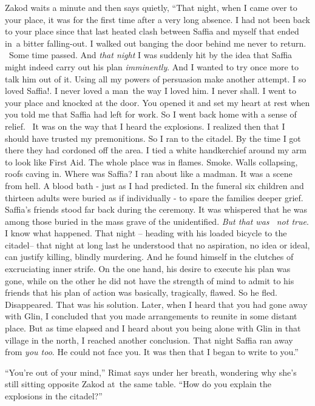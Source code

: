 \documentclass[twoside,11pt]{book}
\begin{document}
Zakod waits a minute and then says quietly, ``That night, when I came over to your place,{
}it was for the first time after a very long absence. I had not been back{ }to
your place since that last heated clash between Saffia and myself that ended in~a bitter falling-out. I walked out
banging the door behind me never to return. ~Some time passed. And \textit{that night} I was suddenly hit by the idea
that Saffia might indeed carry out his plan \textit{imminently}. And I wanted to try once more to talk him out of it.
Using all my powers of persuasion make another attempt. I so loved Saffia!. I never loved a man~the way I loved him. I
never shall. I went to your place and knocked at the door. You opened it and set my heart at rest when you told me that
Saffia had left for work. So I went back home with a sense of relief. \ It was on the way that I heard the explosions.
I realized then that I should have trusted my premonitions. So I ran to the citadel. By the time I got there they had
cordoned off the area. I tied a white handkerchief around my arm to look like First Aid. The whole place was in flames.
Smoke. Walls collapsing, roofs caving in. Where was Saffia? I ran about like a madman. It was a scene from hell. A
blood bath - just as I had predicted. In the funeral six children and thirteen adults were buried as if individually -
to spare the families deeper grief. Saffia's friends stood far back during the ceremony. It was whispered that he was
among those buried in the mass grave of the unidentified. \textit{But that was ~not true}. I know what happened. That
night -- heading with his loaded bicycle to the citadel-- that night at long last he understood that no aspiration, no
idea or ideal, can justify killing, blindly murdering. And he found himself in the clutches of excruciating inner
strife. On the one hand, his desire to execute his plan was gone, while on the other he did not have the strength of
mind to admit to his friends that his plan of action was basically, tragically, flawed. So he fled. Disappeared. That
was his solution. Later, when I heard that you had gone away with Glin, I concluded that you made arrangements to
reunite in some distant place. But as time elapsed and I heard about you being alone with Glin in that village in the
north, I reached another conclusion. That night Saffia ran away from\textit{ you too}. He could not face you. It was
then that I began to write to you.''

``You're out of your mind,'' Rimat says under her breath, wondering why she's still sitting
opposite Zakod at~the same table. ``How do you explain the explosions in the citadel?''
\end{document}
